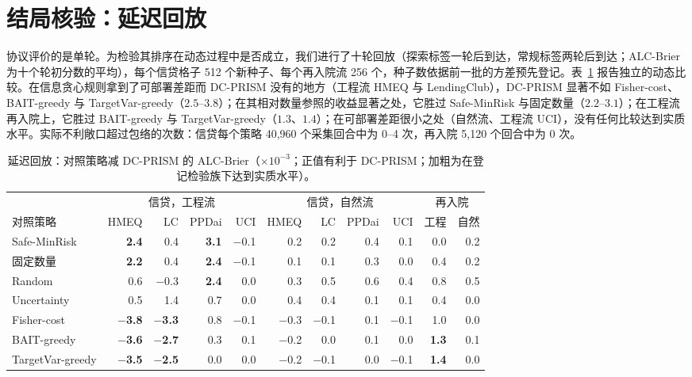 \documentclass[runningheads]{llncs}
\begin{document}
\section{结局核验：延迟回放}
\label{sec:replay}
协议评价的是单轮。为检验其排序在动态过程中是否成立，我们进行了十轮回放（探索标签一轮后到达，常规标签两轮后到达；ALC-Brier 为十个轮初分数的平均），每个信贷格子 512 个新种子、每个再入院流 256 个，种子数依据前一批的方差预先登记。表~\ref{tab:replay} 报告独立的动态比较。在信息贪心规则拿到了可部署差距而 DC-PRISM 没有的地方（工程流 HMEQ 与 LendingClub），DC-PRISM 显著不如 Fisher-cost、BAIT-greedy 与 TargetVar-greedy（$2.5$--$3.8$）；在其相对数量参照的收益显著之处，它胜过 Safe-MinRisk 与固定数量（$2.2$--$3.1$）；在工程流再入院上，它胜过 BAIT-greedy 与 TargetVar-greedy（$1.3$、$1.4$）；在可部署差距很小之处（自然流、工程流 UCI），没有任何比较达到实质水平。实际不利敞口超过包络的次数：信贷每个策略 40{,}960 个采集回合中为 0--4 次，再入院 5{,}120 个回合中为 0 次。

\begin{table}[t]
\caption{延迟回放：对照策略减 DC-PRISM 的 ALC-Brier（$\times10^{-3}$；正值有利于 DC-PRISM；加粗为在登记检验族下达到实质水平）。}
\label{tab:replay}
\centering\scriptsize
\setlength{\tabcolsep}{2.4pt}
\begin{tabular}{lrrrrrrrrrr}
\toprule
& \multicolumn{4}{c}{信贷，工程流} & \multicolumn{4}{c}{信贷，自然流} & \multicolumn{2}{c}{再入院} \\
\cmidrule(lr){2-5}\cmidrule(lr){6-9}\cmidrule(lr){10-11}
对照策略 & HMEQ & LC & PPDai & UCI & HMEQ & LC & PPDai & UCI & 工程 & 自然 \\
\midrule
Safe-MinRisk & \textbf{2.4} & 0.4 & \textbf{3.1} & $-$0.1 & 0.2 & 0.2 & 0.4 & 0.1 & 0.0 & 0.2 \\
固定数量 & \textbf{2.2} & 0.4 & \textbf{2.4} & $-$0.1 & 0.1 & 0.1 & 0.3 & 0.0 & 0.4 & 0.2 \\
Random & 0.6 & $-$0.3 & \textbf{2.4} & 0.0 & 0.3 & 0.5 & 0.6 & 0.4 & 0.8 & 0.5 \\
Uncertainty & 0.5 & 1.4 & 0.7 & 0.0 & 0.4 & 0.4 & 0.1 & 0.1 & 0.4 & 0.0 \\
Fisher-cost & \textbf{$-$3.8} & \textbf{$-$3.3} & 0.8 & $-$0.1 & $-$0.3 & $-$0.1 & 0.1 & $-$0.1 & 1.0 & 0.0 \\
BAIT-greedy & \textbf{$-$3.6} & \textbf{$-$2.7} & 0.3 & 0.1 & $-$0.2 & 0.0 & 0.1 & 0.0 & \textbf{1.3} & 0.1 \\
TargetVar-greedy & \textbf{$-$3.5} & \textbf{$-$2.5} & 0.0 & 0.0 & $-$0.2 & $-$0.1 & 0.0 & $-$0.1 & \textbf{1.4} & 0.0 \\
\bottomrule
\end{tabular}
\end{table}
\end{document}
